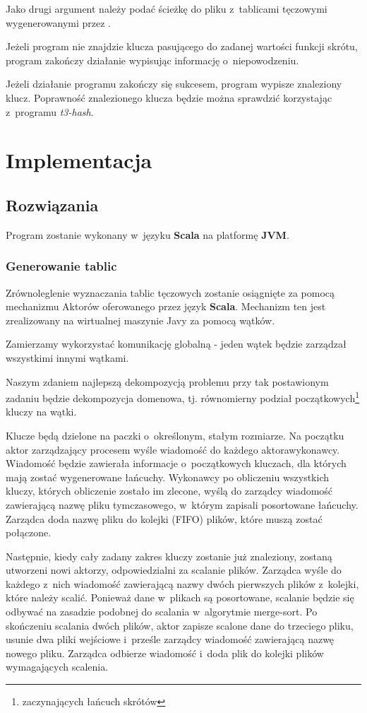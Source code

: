 \documentclass[a4paper]{scrartcl}
\begin{document}
Jako drugi argument należy podać ścieżkę do pliku z~tablicami tęczowymi wygenerowanymi przez \ttt.

Jeżeli program nie znajdzie klucza pasującego do zadanej wartości funkcji skrótu, program zakończy działanie wypisując informację o~niepowodzeniu.

Jeżeli działanie programu zakończy się sukcesem, program wypisze znaleziony klucz. Poprawność znalezionego klucza będzie można sprawdzić korzystając z~programu \emph{t3-hash}.

\section{Implementacja}
\subsection{Rozwiązania}
Program zostanie wykonany w~języku \textbf{Scala} na platformę \textbf{JVM}.

\subsubsection{Generowanie tablic}
Zrównoleglenie wyznaczania tablic tęczowych zostanie osiągnięte za pomocą mechanizmu Aktorów oferowanego przez język \textbf{Scala}.
Mechanizm ten jest zrealizowany na wirtualnej maszynie Javy za pomocą wątków.

Zamierzamy wykorzystać komunikację globalną - jeden wątek będzie zarządzał wszystkimi innymi wątkami.

Naszym zdaniem najlepszą dekompozycją problemu przy tak postawionym zadaniu będzie dekompozycja domenowa, tj. równomierny podział początkowych\footnote{zaczynających łańcuch skrótów} kluczy na wątki.

Klucze będą dzielone na paczki o~określonym, stałym rozmiarze. Na początku aktor zarządzający procesem wyśle wiadomość do każdego aktora\dywiz wykonawcy.
Wiadomość będzie zawierała informacje o~początkowych kluczach, dla których mają zostać wygenerowane łańcuchy.
Wykonawcy po obliczeniu wszystkich kluczy, których obliczenie zostało im zlecone, wyślą do zarządcy wiadomość zawierającą nazwę pliku tymczasowego, w~którym zapisali posortowane łańcuchy.
Zarządca doda nazwę pliku do kolejki (FIFO) plików, które muszą zostać połączone.

Następnie, kiedy cały zadany zakres kluczy zostanie już znaleziony, zostaną utworzeni nowi aktorzy, odpowiedzialni za scalanie plików.
Zarządca wyśle do każdego z~nich wiadomość zawierającą nazwy dwóch pierwszych plików z~kolejki, które należy scalić.
Ponieważ dane w~plikach są posortowane, scalanie będzie się odbywać na zasadzie podobnej do scalania w~algorytmie merge-sort.
Po skończeniu scalania dwóch plików, aktor zapisze scalone dane do trzeciego pliku, usunie dwa pliki wejściowe i~prześle zarządcy wiadomość zawierającą nazwę nowego pliku.
Zarządca odbierze wiadomość i~doda plik do kolejki plików wymagających scalenia.
\end{document}

